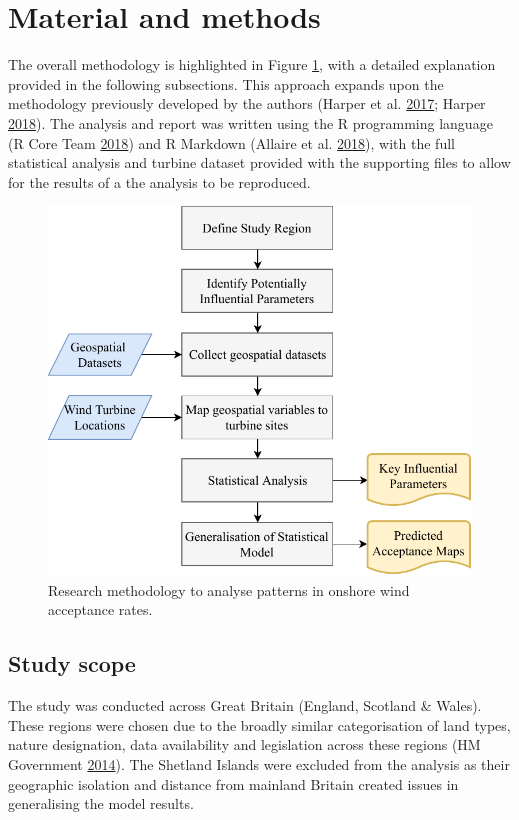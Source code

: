 \documentclass[a4paper,]{article}
\theoremstyle{definition}
\theoremstyle{definition}
\theoremstyle{definition}
\theoremstyle{remark}
\begin{document}
\hypertarget{material-and-methods}{%
\section{Material and methods}\label{material-and-methods}}

The overall methodology is highlighted in Figure \ref{fig:Methodology},
with a detailed explanation provided in the following subsections. This
approach expands upon the methodology previously developed by the
authors (Harper et al. \protect\hyperlink{ref-Harper2017}{2017}; Harper
\protect\hyperlink{ref-Harper2018}{2018}). The analysis and report was
written using the R programming language (R Core Team
\protect\hyperlink{ref-R-base}{2018}) and R Markdown (Allaire et al.
\protect\hyperlink{ref-R-rmarkdown}{2018}), with the full statistical
analysis and turbine dataset provided with the supporting files to allow
for the results of a the analysis to be reproduced.

\begin{figure}[h]

{\centering \includegraphics[width=0.75\linewidth]{../_figures/Flowchart/ResearchApproach} 

}

\caption{Research methodology to analyse patterns in onshore wind acceptance rates.}\label{fig:Methodology}
\end{figure}

\hypertarget{study-scope}{%
\subsection{Study scope}\label{study-scope}}

The study was conducted across Great Britain (England, Scotland \&
Wales). These regions were chosen due to the broadly similar
categorisation of land types, nature designation, data availability and
legislation across these regions (HM Government
\protect\hyperlink{ref-HMGovernment2014}{2014}). The Shetland Islands
were excluded from the analysis as their geographic isolation and
distance from mainland Britain created issues in generalising the model
results.
\end{document}
